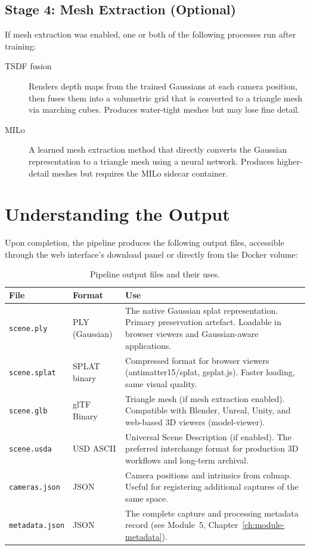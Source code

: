 \subsection{Stage 4: Mesh Extraction (Optional)}

If mesh extraction was enabled, one or both of the following processes run after training:

\begin{description}
  \item[TSDF fusion] Renders depth maps from the trained Gaussians at each camera position, then fuses them into a volumetric grid that is converted to a triangle mesh via marching cubes. Produces water-tight meshes but may lose fine detail.
  \item[MILo] A learned mesh extraction method that directly converts the Gaussian representation to a triangle mesh using a neural network. Produces higher-detail meshes but requires the MILo sidecar container.
\end{description}

\section{Understanding the Output}
\label{sec:proc-output}

Upon completion, the pipeline produces the following output files, accessible through the web interface's download panel or directly from the Docker volume:

\begin{table}[htbp]
  \centering
  \caption{Pipeline output files and their uses.}
  \label{tab:output-files}
  \begin{tabular}{@{}l l L{6cm}@{}}
    \toprule
    \textbf{File} & \textbf{Format} & \textbf{Use} \\
    \midrule
    \texttt{scene.ply}   & PLY (Gaussian) & The native Gaussian splat representation. Primary preservation artefact. Loadable in browser viewers and Gaussian-aware applications. \\
    \texttt{scene.splat}  & SPLAT binary   & Compressed format for browser viewers (antimatter15/splat, gsplat.js). Faster loading, same visual quality. \\
    \texttt{scene.glb}    & glTF Binary    & Triangle mesh (if mesh extraction enabled). Compatible with Blender, Unreal, Unity, and web-based 3D viewers (model-viewer). \\
    \texttt{scene.usda}   & USD ASCII      & Universal Scene Description (if enabled). The preferred interchange format for production 3D workflows and long-term archival. \\
    \texttt{cameras.json} & JSON           & Camera positions and intrinsics from \acrshort{colmap}. Useful for registering additional captures of the same space. \\
    \texttt{metadata.json} & JSON          & The complete capture and processing metadata record (see Module~5, Chapter~\ref{ch:module-metadata}). \\
    \bottomrule
  \end{tabular}
\end{table}

